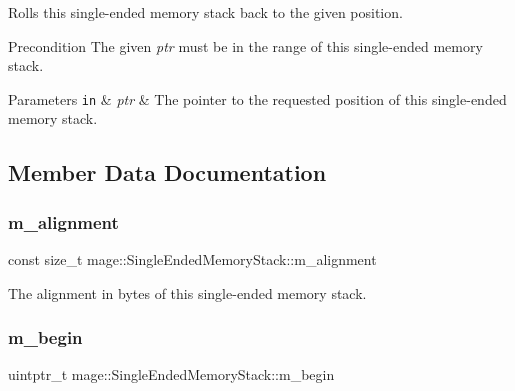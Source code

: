 Rolls this single-\/ended memory stack back to the given position.

\begin{DoxyPrecond}{Precondition}
The given {\itshape ptr} must be in the range of this single-\/ended memory stack. 
\end{DoxyPrecond}

\begin{DoxyParams}[1]{Parameters}
\mbox{\tt in}  & {\em ptr} & The pointer to the requested position of this single-\/ended memory stack. \\
\hline
\end{DoxyParams}


\subsection{Member Data Documentation}
\mbox{\label{classmage_1_1_single_ended_memory_stack_aeb5bc5af575eaeb5a0f08669a717cd28}} 
\subsubsection{\texorpdfstring{m\+\_\+alignment}{m\_alignment}}
{\footnotesize\ttfamily const size\+\_\+t mage\+::\+Single\+Ended\+Memory\+Stack\+::m\+\_\+alignment\hspace{0.3cm}{\ttfamily [private]}}

The alignment in bytes of this single-\/ended memory stack. \mbox{\label{classmage_1_1_single_ended_memory_stack_a859a80ab120c14e3ebf4a310d5263507}} 
\subsubsection{\texorpdfstring{m\+\_\+begin}{m\_begin}}
{\footnotesize\ttfamily uintptr\+\_\+t mage\+::\+Single\+Ended\+Memory\+Stack\+::m\+\_\+begin\hspace{0.3cm}{\ttfamily [private]}}


